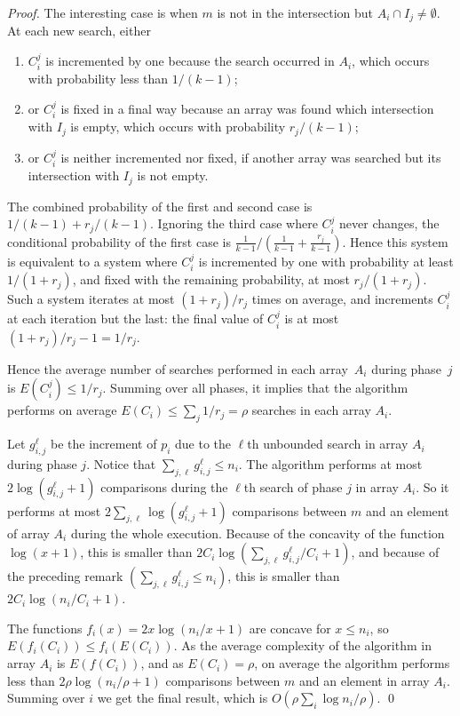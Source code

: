 \begin{proof}
The interesting case is when $m$ is not in the intersection but
$A_i\cap I_j\neq\emptyset$.
%
At each new search, either 
\begin{enumerate}
\item $C_i^j$ is incremented by one because the search occurred in
  $A_i$, which occurs with probability less than ${1/(k-1)}$;
%
\item or $C_i^j$ is fixed in a final way because an array was found
  which intersection with $I_j$ is empty, which occurs with
  probability ${r_j/(k-1)}$;
%
\item or $C_i^j$ is neither incremented nor fixed, if another array
  was searched but its intersection with $I_j$ is not empty.
\end{enumerate}
% 
The combined probability of the first and second case is
$1/(k-1)+r_j/(k-1)$.
%
Ignoring the third case where $C_i^j$ never changes, the conditional
probability of the first case is
$\frac{1}{k-1}/(\frac{1}{k-1}+\frac{r_j}{k-1})$.
%
Hence this system is equivalent to a system where $C_i^j$ is
incremented by one with probability at least $1/(1+r_j)$,
% 
and fixed with the remaining probability, at most ${r_j/(1+r_j)}$.
%
Such a system iterates at most $(1+r_j)/r_j$ times on average, and
increments $C_i^j$ at each iteration but the last: the final value
of $C_i^j$ is at most $(1+r_j)/r_j-1=1/r_j$.

    Hence the average number of searches performed in each array~$A_i$
    during phase~$j$ is $E(C_i^j)\leq 1/r_j$.
%
    Summing over all phases, it implies that the algorithm performs on
    average $E(C_i)\leq\sum_j {1/r_j}=\rho$ searches in each array
    $A_i$.



    Let $g_{i,j}^\ell$ be the increment of $p_i$ due to the $\ell$th
    unbounded search in array $A_i$ during phase $j$.
%
    Notice that $\sum_{j,\ell}g_{i,j}^\ell \leq n_i$.
%
    The algorithm performs at most $2\log(g_{i,j}^\ell+1)$ comparisons
    during the $\ell$th search of phase $j$ in array $A_i$.
%
    So it performs at most $2\sum_{j,\ell}\log(g_{i,j}^\ell+1)$
    comparisons between $m$ and an element of array $A_i$ during the
    whole execution.
%
    Because of the concavity of the function $\log(x+1)$, this is
    smaller than $2C_i\log(\sum_{j,\ell}{g_{i,j}^\ell/C_i}+1)$, and
    because of the preceding remark
    $\left(\sum_{j,\ell}g_{i,j}^\ell{\leq}n_i\right)$, this is smaller
    than $2C_i\log({n_i/C_i}+1)$.


    The functions $f_i(x){=}2x\log({n_i/x}{+}1)$ are concave for
    $x{\leq}n_i$, so $E(f_i(C_i)){\leq}f_i(E(C_i))$.
%
    As the average complexity of the algorithm in array $A_i$ is
    $E(f(C_i))$, and as $E(C_i)=\rho$, on average the algorithm
    performs less than $2\rho\log({n_i/\rho}+1)$ comparisons between
    $m$ and an element in array $A_i$.
%
    Summing over $i$ we get the final result, which is
    $O(\rho\sum_i\log{n_i/\rho}).$ \qed\end{proof}




